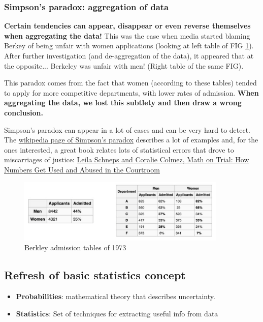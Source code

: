\subsubsection{Simpson's paradox: aggregation of data}

\textbf{Certain tendencies can appear, disappear or even reverse themselves when aggregating the data!} This was the case when media started blaming Berkey of being unfair with women applications (looking at left table of FIG \ref{pic:Berkley}). After further investigation (and de-aggregation of the data), it appeared that at the opposite... Berkeley was unfair with men! (Right table of the same FIG).

This paradox comes from the fact that women (according to these tables) tended to apply for more competitive departments, with lower rates of admission. \textbf{When aggregating the data, we lost this subtlety and then draw a wrong conclusion.} 

Simpson's paradox can appear in a lot of cases and can be very hard to detect. The \href{https://en.wikipedia.org/wiki/Simpsons_paradox}{wikipedia page of Simpson's paradox} describes a lot of examples and, for the ones interested, a great book relates lots of statistical errors that drove to miscarriages of justice: \href{https://books.google.ch/books/about/Math_on_Trial.html?id=PFAIb6FTgY4C&source=kp_cover&redir_esc=y&hl=fr}{Leila Schneps and Coralie Colmez, Math on Trial: How Numbers Get Used and Abused in the Courtroom} 

\begin{figure}[h]%
 \centering
 \includegraphics[width=10cm]{./pic/Berkley}
 \caption{\label{pic:Berkley}Berkley admission tables of 1973}
\end{figure}

\subsection{Refresh of basic statistics concept}

\begin{itemize}
	\item {\bf Probabilities}: mathematical theory that describes uncertainty. \\
	\item {\bf Statistics}: Set of techniques for extracting useful info from data
\end{itemize}

